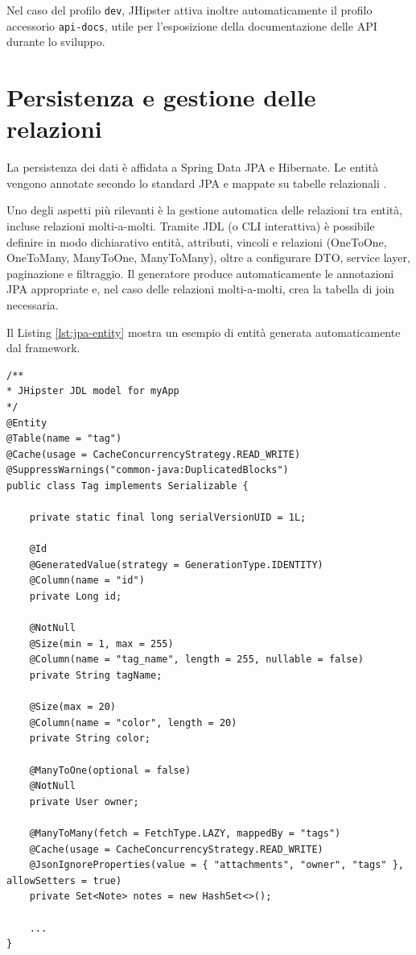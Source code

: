 Nel caso del profilo \texttt{dev}, JHipster attiva inoltre automaticamente il profilo accessorio \texttt{api-docs}, utile per l’esposizione della documentazione delle API durante lo sviluppo.

\section{Persistenza e gestione delle relazioni}

La persistenza dei dati è affidata a Spring Data JPA e Hibernate. Le entità vengono annotate secondo lo standard JPA e mappate su tabelle relazionali \cite{HibernateDocs}.

Uno degli aspetti più rilevanti è la gestione automatica delle relazioni tra entità, incluse relazioni molti-a-molti. Tramite JDL (o CLI interattiva) è possibile definire in modo dichiarativo entità, attributi, vincoli e relazioni (OneToOne, OneToMany, ManyToOne, ManyToMany), oltre a configurare DTO, service layer, paginazione e filtraggio. Il generatore produce automaticamente le annotazioni JPA appropriate e, nel caso delle relazioni molti-a-molti, crea la tabella di join necessaria.

Il Listing \ref{lst:jpa-entity} mostra un esempio di entità generata automaticamente dal framework.

\captionsetup{type=listing}
\label{lst:jpa-entity}
\begin{verbatim}
/**
* JHipster JDL model for myApp
*/
@Entity
@Table(name = "tag")
@Cache(usage = CacheConcurrencyStrategy.READ_WRITE)
@SuppressWarnings("common-java:DuplicatedBlocks")
public class Tag implements Serializable {
	
	private static final long serialVersionUID = 1L;
	
	@Id
	@GeneratedValue(strategy = GenerationType.IDENTITY)
	@Column(name = "id")
	private Long id;
	
	@NotNull
	@Size(min = 1, max = 255)
	@Column(name = "tag_name", length = 255, nullable = false)
	private String tagName;
	
	@Size(max = 20)
	@Column(name = "color", length = 20)
	private String color;
	
	@ManyToOne(optional = false)
	@NotNull
	private User owner;
	
	@ManyToMany(fetch = FetchType.LAZY, mappedBy = "tags")
	@Cache(usage = CacheConcurrencyStrategy.READ_WRITE)
	@JsonIgnoreProperties(value = { "attachments", "owner", "tags" }, allowSetters = true)
	private Set<Note> notes = new HashSet<>();
	
	...
}
\end{verbatim}

